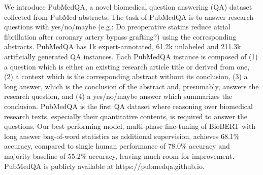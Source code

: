 We introduce PubMedQA, a novel biomedical question answering (QA) dataset collected from PubMed abstracts. The task of PubMedQA is to answer research questions with yes/no/maybe (e.g.: Do preoperative statins reduce atrial fibrillation after coronary artery bypass grafting?) using the corresponding abstracts. PubMedQA has 1k expert-annotated, 61.2k unlabeled and 211.3k artificially generated QA instances. Each PubMedQA instance is composed of (1) a question which is either an existing research article title or derived from one, (2) a context which is the corresponding abstract without its conclusion, (3) a long answer, which is the conclusion of the abstract and, presumably, answers the research question, and (4) a yes/no/maybe answer which summarizes the conclusion. PubMedQA is the first QA dataset where reasoning over biomedical research texts, especially their quantitative contents, is required to answer the questions. Our best performing model, multi-phase fine-tuning of BioBERT with long answer bag-of-word statistics as additional supervision, achieves 68.1\% accuracy, compared to single human performance of 78.0\% accuracy and majority-baseline of 55.2\% accuracy, leaving much room for improvement. PubMedQA is publicly available at https://pubmedqa.github.io.